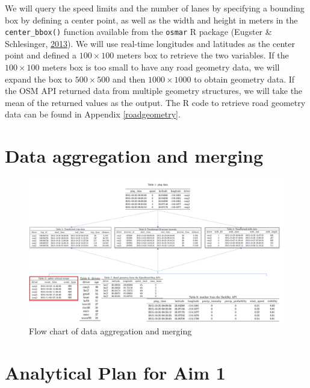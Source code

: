 \documentclass[12pt]{book}
\numberwithin{equation}{chapter}
\begin{document}
We will query the speed limits and the number of lanes by specifying a bounding box by defining a center point, as well as the width and height in meters in the \texttt{center\_bbox()} function available from the \texttt{osmar} R package (Eugster \& Schlesinger, \protect\hyperlink{ref-eugster2013osmar}{2013}).
We will use real-time longitudes and latitudes as the center point and defined a \(100\times100\) meters box to retrieve the two variables.
If the \(100\times100\) meters box is too small to have any road geometry data, we will expand the box to \(500\times500\) and then \(1000\times1000\) to obtain geometry data.
If the OSM API returned data from multiple geometry structures, we will take the mean of the returned values as the output.
The R code to retrieve road geometry data can be found in Appendix \ref{roadgeometry}.

\hypertarget{data-aggregation-and-merging}{%
\section{Data aggregation and merging}\label{data-aggregation-and-merging}}

\begin{figure}[h]

{\centering \includegraphics[width=\linewidth]{figs/Data_merging} 

}

\caption{Flow chart of data aggregation and merging}\label{fig:unnamed-chunk-1}
\end{figure}

\hypertarget{analytical-plan-for-aim-1}{%
\section{Analytical Plan for Aim 1}\label{analytical-plan-for-aim-1}}
\end{document}
